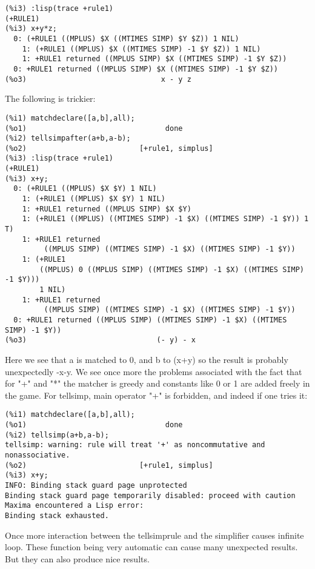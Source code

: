 \documentclass[a4paper,11pt]{article}
\begin{document}
\begin{verbatim}
(%i3) :lisp(trace +rule1)
(+RULE1)
(%i3) x+y*z;
  0: (+RULE1 ((MPLUS) $X ((MTIMES SIMP) $Y $Z)) 1 NIL)
    1: (+RULE1 ((MPLUS) $X ((MTIMES SIMP) -1 $Y $Z)) 1 NIL)
    1: +RULE1 returned ((MPLUS SIMP) $X ((MTIMES SIMP) -1 $Y $Z))
  0: +RULE1 returned ((MPLUS SIMP) $X ((MTIMES SIMP) -1 $Y $Z))
(%o3)                               x - y z
\end{verbatim}
The following is trickier:
\begin{verbatim}
(%i1) matchdeclare([a,b],all);
(%o1)                                done
(%i2) tellsimpafter(a+b,a-b);
(%o2)                          [+rule1, simplus]
(%i3) :lisp(trace +rule1)
(+RULE1)
(%i3) x+y;
  0: (+RULE1 ((MPLUS) $X $Y) 1 NIL)
    1: (+RULE1 ((MPLUS) $X $Y) 1 NIL)
    1: +RULE1 returned ((MPLUS SIMP) $X $Y)
    1: (+RULE1 ((MPLUS) ((MTIMES SIMP) -1 $X) ((MTIMES SIMP) -1 $Y)) 1 T)
    1: +RULE1 returned
         ((MPLUS SIMP) ((MTIMES SIMP) -1 $X) ((MTIMES SIMP) -1 $Y))
    1: (+RULE1
        ((MPLUS) 0 ((MPLUS SIMP) ((MTIMES SIMP) -1 $X) ((MTIMES SIMP) -1 $Y)))
        1 NIL)
    1: +RULE1 returned
         ((MPLUS SIMP) ((MTIMES SIMP) -1 $X) ((MTIMES SIMP) -1 $Y))
  0: +RULE1 returned ((MPLUS SIMP) ((MTIMES SIMP) -1 $X) ((MTIMES SIMP) -1 $Y))
(%o3)                              (- y) - x
\end{verbatim}
Here we see that a is matched to 0, and b to (x+y) so the result is
probably unexpectedly -x-y.  We see once more the problems associated
with the fact that for "+" and "*" the matcher is greedy and constants
like 0 or 1 are added freely in the game. For tellsimp, main operator "+"
is forbidden, and indeed if one tries it:
\begin{verbatim}
(%i1) matchdeclare([a,b],all);
(%o1)                                done
(%i2) tellsimp(a+b,a-b);
tellsimp: warning: rule will treat '+' as noncommutative and nonassociative.
(%o2)                          [+rule1, simplus]
(%i3) x+y;
INFO: Binding stack guard page unprotected
Binding stack guard page temporarily disabled: proceed with caution
Maxima encountered a Lisp error:
Binding stack exhausted.
\end{verbatim}

Once more interaction between the tellsimprule and the simplifier
causes infinite loop. These function being very automatic can cause
many unexpected results. But they can also produce nice results.
\end{document}
